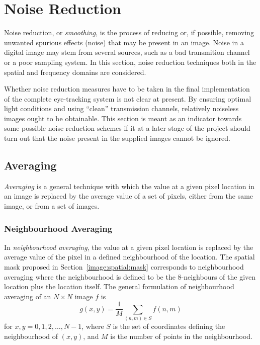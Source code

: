 
\section{Noise Reduction}
\label{image:noise}

Noise reduction, or {\em smoothing\/}, is the process of reducing or,
if possible, removing unwanted spurious effects (noise) that may be
present in an image.  Noise in a digital image may stem from several
sources, such as a bad transmition channel or a poor sampling system.
In this section, noise reduction techniques both in the spatial and
frequency domains are considered.

Whether noise reduction measures have to be taken in the final
implementation of the complete eye-tracking system is not clear at
present.  By ensuring optimal light conditions and using ``clean''
transmission channels, relatively noiseless images ought to be
obtainable.  This section is meant as an indicator towards some
possible noise reduction schemes if it at a later stage of the project
should turn out that the noise present in the supplied images cannot
be ignored.

\subsection{Averaging}
\label{image:noise:averaging}

{\em Averaging\/} is a general technique with which the value at a
given pixel location in an image is replaced by the average value of a
set of pixels, either from the same image, or from a set of images.

\subsubsection{Neighbourhood Averaging}

In {\em neighbourhood averaging\/}, the value at a given pixel
location is replaced by the average value of the pixel in a defined
neighbourhood of the location.  The spatial mask proposed in
Section~\ref{image:spatial:mask} corresponds to neighbourhood
averaging where the neighbourhood is defined to be the 8-neighbours of
the given location plus the location itself.  The general formulation
of neighbourhood averaging of an $N\times N$ image $f$ is
\begin{equation}
\label{eq:averaging:neighbourhood}
  g(x,y)=\frac{1}{M}\sum_{(n,m)\in S}f(n,m)
\end{equation}
for $x,y=0,1,2,\ldots,N-1$, where $S$ is the set of coordinates
defining the neighbourhood of $(x,y)$, and $M$ is the number of points
in the neighbourhood.

